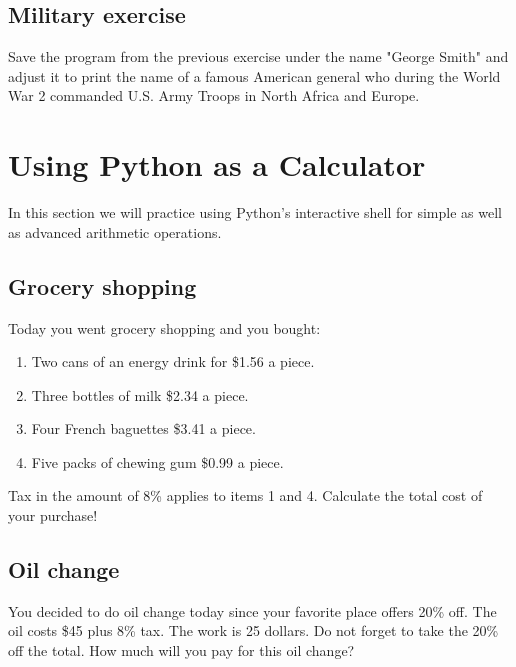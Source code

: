 
\subsection{Military exercise}

Save the program from the previous exercise under the name 
"George Smith" and adjust it to print the name of a famous American
general who during the World War 2 commanded U.S. Army Troops
in North Africa and Europe. 


\section{Using Python as a Calculator}

In this section we will practice using Python's interactive shell for simple 
as well as advanced arithmetic operations.


\subsection{Grocery shopping}

Today you went grocery shopping and you bought:
\begin{enumerate}
\item Two cans of an energy drink for \$1.56 a piece.
\item Three bottles of milk \$2.34 a piece.
\item Four French baguettes \$3.41 a piece.
\item Five packs of chewing gum \$0.99 a piece.
\end{enumerate}
Tax in the amount of 8\% applies to items 1 and 4.
Calculate the total cost of your purchase!


\subsection{Oil change}

You decided to do oil change today since your favorite 
place offers 20\% off. The oil costs \$45 plus 8\% tax. 
The work is 25 dollars. Do not forget to take the 20\% off the 
total. How much will you pay for this oil change? 

